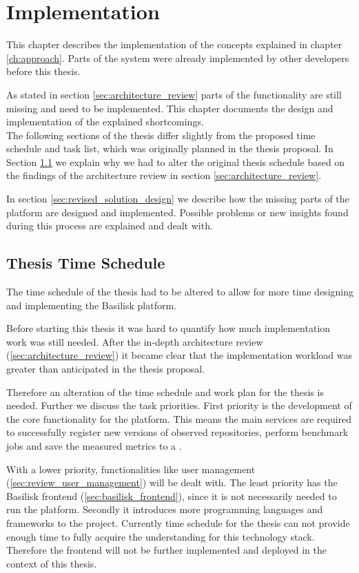 \chapter{Implementation}
\label{ch:implementation}



This chapter describes the implementation of the concepts explained in chapter \ref{ch:approach}.
Parts of the system were already implemented by other developers before this thesis.

As stated in section \ref{sec:architecture_review} parts of the functionality are still missing and need to be implemented.
This chapter documents the design and implementation of the explained shortcomings.
\\

The following sections of the thesis differ slightly from the proposed time schedule and task list, which was originally planned in the thesis proposal.
In Section \ref{sec:time_schedule} we explain why we had to alter the original thesis schedule based on the findings of the architecture review in section \ref{sec:architecture_review}.


In section \ref{sec:revised_solution_design} we describe how the missing parts of the platform are designed and implemented.
Possible problems or new insights found during this process are explained and dealt with.



\section{Thesis Time Schedule}
\label{sec:time_schedule}
The time schedule of the thesis had to be altered to allow for more time designing and implementing the Basilisk platform.

Before starting this thesis it was hard to quantify how much implementation work was still needed.
After the in-depth architecture review (\ref{sec:architecture_review}) it became clear that the implementation workload was greater than anticipated in the thesis proposal.

Therefore an alteration of the time schedule and work plan for the thesis is needed.
Further we discuss the task priorities.
First priority is the development of the core functionality for the platform.
This means the main services are required to successfully register new versions of observed repositories, perform benchmark jobs and save the measured metrics to a \ts{}.


With a lower priority, functionalities like user management (\ref{sec:review_user_management}) will be dealt with.
The least priority has the Basilisk frontend (\ref{sec:basilisk_frontend}), since it is not necessarily needed to run the platform.
Secondly it introduces more programming languages and frameworks to the project.
Currently time schedule for the thesis can not provide enough time to fully acquire the understanding for this technology stack.
Therefore the frontend will not be further implemented and deployed in the context of this thesis.


